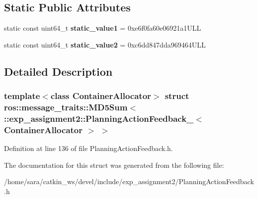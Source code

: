 \subsection*{Static Public Attributes}
\begin{DoxyCompactItemize}
\item 
\mbox{\label{structros_1_1message__traits_1_1MD5Sum_3_01_1_1exp__assignment2_1_1PlanningActionFeedback___3_01ContainerAllocator_01_4_01_4_ac4348c2cec2cfeae8c2c918e2055f435}} 
static const uint64\+\_\+t {\bfseries static\+\_\+value1} = 0xe6f0fa60e06921a1\+U\+LL
\item 
\mbox{\label{structros_1_1message__traits_1_1MD5Sum_3_01_1_1exp__assignment2_1_1PlanningActionFeedback___3_01ContainerAllocator_01_4_01_4_a0bf1605ac7a0e7b00b5ce742274a0abc}} 
static const uint64\+\_\+t {\bfseries static\+\_\+value2} = 0xc6dd847dda969464\+U\+LL
\end{DoxyCompactItemize}


\subsection{Detailed Description}
\subsubsection*{template$<$class Container\+Allocator$>$\newline
struct ros\+::message\+\_\+traits\+::\+M\+D5\+Sum$<$ \+::exp\+\_\+assignment2\+::\+Planning\+Action\+Feedback\+\_\+$<$ Container\+Allocator $>$ $>$}



Definition at line 136 of file Planning\+Action\+Feedback.\+h.



The documentation for this struct was generated from the following file\+:\begin{DoxyCompactItemize}
\item 
/home/sara/catkin\+\_\+ws/devel/include/exp\+\_\+assignment2/Planning\+Action\+Feedback.\+h\end{DoxyCompactItemize}
